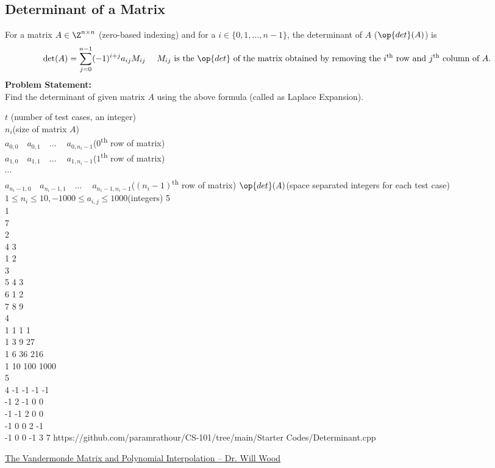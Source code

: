 \documentclass[../../Problems]{subfiles}
\begin{document}
\subsection{Determinant of a Matrix}
For a matrix $A\in \Z^{n\times n}$ (zero-based indexing) and for a $i\in\{0,1,\ldots,n-1\}$, the determinant of $A$ ($\op{det}(A)$) is
\begin{equation}
\det(A)=\sum _{j=0}^{n-1}(-1)^{i+j}a_{ij}M_{ij}%
\quad \text{ $M_{ij}$ is the $\op{det}$ of the matrix obtained by removing the $i$\textsuperscript{th} row and $j$\textsuperscript{th} column of $A$.}%
\end{equation}
\textbf{Problem Statement:}\\
Find the determinant of given matrix $A$ using the above formula (called as Laplace Expansion).
\begin{testcases}
	{$t$ \hfill(number of test cases, an integer)\\$n_i$\hfill(size of matrix $A$)\\$a_{0,0}\quad a_{0,1}\quad \ldots \quad\ a_{0,n_i-1}$\quad\hfill($0$\textsuperscript{th} row of matrix)\\$a_{1,0}\quad a_{1,1}\quad \ldots \quad\ a_{1,n_i-1}$\quad \hfill($1$\textsuperscript{th} row of matrix)\\$\cdots$\\$a_{n_i-1,0}\quad a_{n_i-1,1}\quad \ldots \quad\ a_{n_i-1,n_i-1}$\hfill($(n_i-1)$\textsuperscript{th} row of matrix)}
	{$\op{det}(A)$\hfill(space separated integers for each test case)}
	{$1\leq n_i \leq 10, -1000\leq a_{i,j}\leq 1000$\hfill(integers)}
	{5\\1\\7\\2\\4 3\\1 2\\3\\5 4 3\\6 1 2\\7 8 9\\4\\1 1 1 1\\1 3 9 27\\1 6 36 216\\1 10 100 1000\\5\\4 -1 -1 -1 -1\\-1 2 -1 0 0\\-1 -1 2 0 0 \\-1 0 0 2 -1\\-1 0 0 -1 3}
	{7}
	{https://github.com/paramrathour/CS-101/tree/main/Starter Codes/Determinant.cpp}
\end{testcases}
\begin{funvideo}
	\href{https://youtu.be/Cov_kLatdlc}{The Vandermonde Matrix and Polynomial Interpolation -- Dr. Will Wood}
\end{funvideo}
\end{document}
